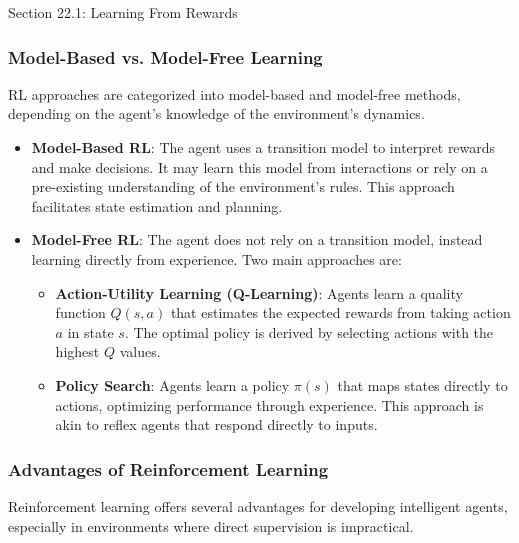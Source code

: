 \begin{notes}{Section 22.1: Learning From Rewards}
\begin{highlight}
    \end{highlight}
    
    \subsubsection*{Model-Based vs. Model-Free Learning}
    
    RL approaches are categorized into model-based and model-free methods, depending on the agent's knowledge of the environment's dynamics.
    
    \begin{highlight}
    
        \begin{itemize}
            \item \textbf{Model-Based RL}: The agent uses a transition model to interpret rewards and make decisions. It may learn this model from interactions or rely on a pre-existing understanding of 
            the environment's rules. This approach facilitates state estimation and planning.
            \item \textbf{Model-Free RL}: The agent does not rely on a transition model, instead learning directly from experience. Two main approaches are:
                \begin{itemize}
                    \item \textbf{Action-Utility Learning (Q-Learning)}: Agents learn a quality function $Q(s, a)$ that estimates the expected rewards from taking action $a$ in state $s$. The optimal 
                    policy is derived by selecting actions with the highest $Q$ values.
                    \item \textbf{Policy Search}: Agents learn a policy $\pi(s)$ that maps states directly to actions, optimizing performance through experience. This approach is akin to reflex agents 
                    that respond directly to inputs.
                \end{itemize}
        \end{itemize}
    
    \end{highlight}
    
    \subsubsection*{Advantages of Reinforcement Learning}
    
    Reinforcement learning offers several advantages for developing intelligent agents, especially in environments where direct supervision is impractical.
    

\end{notes}
